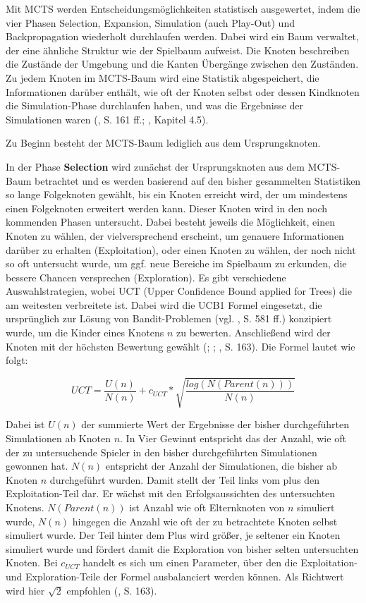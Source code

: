 
Mit MCTS werden Entscheidungsmöglichkeiten statistisch ausgewertet, indem die vier Phasen Selection, Expansion, Simulation (auch Play-Out) und Backpropagation wiederholt durchlaufen werden. Dabei wird ein Baum verwaltet, der eine ähnliche Struktur wie der Spielbaum aufweist. Die Knoten beschreiben die Zustände der Umgebung und die Kanten Übergänge zwischen den Zuständen. Zu jedem Knoten im MCTS-Baum wird eine Statistik abgespeichert, die Informationen darüber enthält, wie oft der Knoten selbst oder dessen Kindknoten die Simulation-Phase durchlaufen haben, und was die Ergebnisse der Simulationen waren (\cite{Russell.2020}, S. 161 ff.; \cite{Ferguson.January2019}, Kapitel 4.5).

Zu Beginn besteht der MCTS-Baum lediglich aus dem Ursprungsknoten.

In der Phase \textbf{Selection} wird zunächst der Ursprungsknoten aus dem MCTS-Baum betrachtet und es werden basierend auf den bisher gesammelten Statistiken so lange Folgeknoten gewählt, bis ein Knoten erreicht wird, der um mindestens einen Folgeknoten erweitert werden kann. Dieser Knoten wird in den noch kommenden Phasen untersucht. Dabei besteht jeweils die Möglichkeit, einen Knoten zu wählen, der vielversprechend erscheint, um genauere Informationen darüber zu erhalten (Exploitation), oder einen Knoten zu wählen, der noch nicht so oft untersucht wurde, um ggf. neue Bereiche im Spielbaum zu erkunden, die bessere Chancen versprechen (Exploration). Es gibt verschiedene Auswahlstrategien, wobei UCT (Upper Confidence Bound applied for Trees) die am weitesten verbreitete ist. Dabei wird die UCB1 Formel eingesetzt, die ursprünglich zur Lösung von Bandit-Problemen (vgl. \cite{Russell.2020}, S. 581 ff.) konzipiert wurde, um die Kinder eines Knotens $n$ zu bewerten. Anschließend wird der Knoten mit der höchsten Bewertung gewählt (\cite{Kocsis.2006}; \cite{Browne.2012}; \cite{Russell.2020}, S. 163). Die Formel lautet wie folgt:

\begin{equation*}
	UCT = \frac{U(n)}{N(n)} + c_{UCT} * \sqrt{\frac{log(N(Parent(n)))}{N(n)}}
\end{equation*}

Dabei ist $U(n)$ der summierte Wert der Ergebnisse der bisher durchgeführten Simulationen ab Knoten $n$. In Vier Gewinnt entspricht das der Anzahl, wie oft der zu untersuchende Spieler in den bisher durchgeführten Simulationen gewonnen hat. $N(n)$ entspricht der Anzahl der Simulationen, die bisher ab Knoten $n$ durchgeführt wurden. Damit stellt der Teil links vom plus den Exploitation-Teil dar. Er wächst mit den Erfolgsaussichten des untersuchten Knotens.
$N(Parent(n))$ ist Anzahl wie oft Elternknoten von $n$ simuliert wurde, $N(n)$ hingegen die Anzahl wie oft der zu betrachtete Knoten selbst simuliert wurde. Der Teil hinter dem Plus wird größer, je seltener ein Knoten simuliert wurde und fördert damit die Exploration von bisher selten untersuchten Knoten.
Bei $c_{UCT}$ handelt es sich um einen Parameter, über den die Exploitation- und Exploration-Teile der Formel ausbalanciert werden können. Als Richtwert wird hier $\sqrt{2}$ empfohlen (\cite{Russell.2020}, S. 163).

